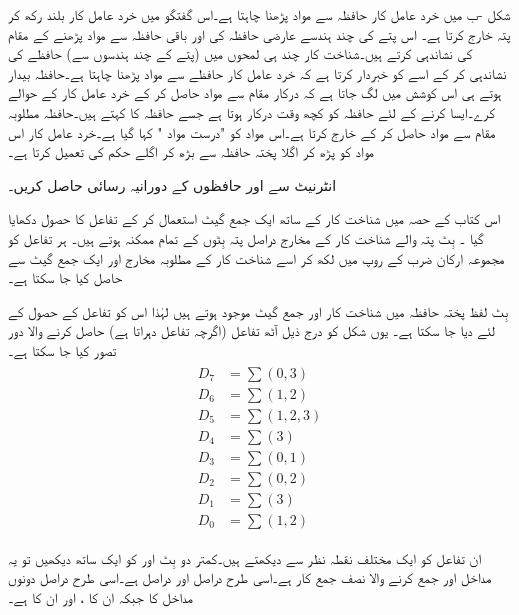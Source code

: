 شکل -ب میں خرد عامل کار حافظہ سے مواد پڑھنا چاہتا ہے۔اس گفتگو میں خرد عامل کار  بلند رکھ کر پتہ خارج کرتا ہے۔ اس پتے کی چند ہندسے عارضی حافظہ کی اور باقی حافظہ سے مواد پڑھنے کے مقام کی نشاندہی کرتے ہیں۔شناخت کار چند ہی لمحوں میں (پتے کے چند ہندسوں سے) حافظے کی نشاندہی کر کے اسے کو خبردار کرتا ہے کہ خرد عامل کار حافظے سے مواد پڑھنا چاہتا ہے۔حافظہ بیدار ہوتے ہی اس کوشش میں لگ جاتا ہے کہ درکار مقام سے مواد حاصل کر کے خرد عامل کار کے حوالے کرے۔ایسا کرنے کے لئے حافظہ کو کچھ وقت درکار ہوتا ہے جسے حافظہ کا  کہتے ہیں۔حافظہ مطلوبہ مقام سے مواد حاصل کر کے خارج کرتا ہے۔اس مواد کو "درست مواد " کہا گیا ہے۔خرد عامل کار اس مواد کو پڑھ کر اگلا  پختہ حافظہ سے بڑھ کر اگلے حکم کی تعمیل کرتا ہے۔

انٹرنیٹ سے  اور  حافظوں کے دورانیہ رسائی حاصل کریں۔

اس کتاب کے حصہ  میں شناخت کار کے ساتھ ایک جمع گیٹ استعمال کر کے تفاعل کا حصول دکھایا گیا ۔  بِٹ پتہ والے شناخت کار کے  مخارج دراصل پتہ بِٹوں کے تمام ممکنہ  ہوتے ہیں۔ ہر تفاعل کو مجموعہ ارکان ضرب کے روپ میں لکھ کر اسے شناخت کار کے مطلوبہ مخارج اور ایک جمع گیٹ سے حاصل کیا جا سکتا ہے۔ 

 بِٹ لفظ پختہ حافظہ میں شناخت کار اور  جمع گیٹ موجود ہوتے ہیں لہٰذا اس کو  تفاعل کے حصول کے لئے  دیا جا سکتا ہے۔ یوں شکل  کو درج ذیل آٹھ تفاعل (اگرچہ  تفاعل  دہراتا ہے) حاصل کرنے والا دور تصور کیا جا سکتا ہے۔
\begin{gather}
\begin{aligned}
D_7&=\sum (0,3)\\
D_6&=\sum(1,2)\\
D_5&=\sum (1,2,3)\\
D_4&=\sum(3)\\
D_3&=\sum(0,1)\\
D_2&=\sum (0,2)\\
D_1&=\sum(3)\\
D_0&=\sum(1,2)
\end{aligned}
\end{gather}

ان تفاعل کو ایک مختلف نقطہ نظر سے دیکھتے ہیں۔کمتر دو بِٹ  اور  کو ایک ساتھ  دیکھیں تو یہ مداخل  اور  جمع کرنے والا نصف جمع کار ہے۔اسی طرح  دراصل  اور  دراصل  ہے۔اسی طرح  دراصل دونوں مداخل کا  جبکہ  ان کا ،   اور  ان کا ہے۔

